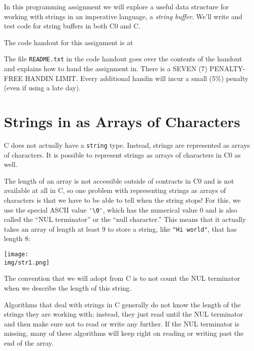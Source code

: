 \documentclass[12pt]{exam}
\begin{document}
\hwTitle

\noindent
In this programming assignment we will explore a useful data structure
for working with strings in an imperative language, a \emph{string
  buffer}. We'll write and test code for string buffers in both C0 and
C.

\bigskip
\noindent
The code handout for this assignment is at
\begin{center}
\end{center}
The file \lstinline'README.txt' in the code handout goes over the
contents of the handout and explains how to hand the assignment in.
There is a SEVEN (7) PENALTY-FREE HANDIN LIMIT.
Every additional handin will incur a small (5\%) penalty (even if
using a late day).


\section{Strings in as Arrays of Characters}
\label{sec:cstrings}

C does not actually have a \lstinline'string' type. Instead, strings
are represented as arrays of characters. It is possible to represent
strings as arrays of characters in C0 as well.

The length of an array is not accessible outside of contracts in C0
and is not available at all in C, so one problem with representing
strings as arrays of characters is that we have to be able to tell
when the string stops! For this, we use the special ASCII value
\lstinline"'\0'", which has the numerical value 0 and is also called
the ``NUL terminator'' or the ``null character.'' This means that it
actually takes an array of length at least 9 to store a string, like
\lstinline'"Hi world"', that has length 8:
\begin{center}
  \texttt{[image: \\img/str1.png]}
\end{center}
The convention that we will adopt from C is to not count the NUL
terminator when we describe the length of this string.

Algorithms that deal with strings in C generally do not know the
length of the strings they are working with; instead, they just read
until the NUL terminator and then make sure not to read or write any
further. If the NUL terminator is missing, many of these algorithms
will keep right on reading or writing past the end of the array.
\end{document}
